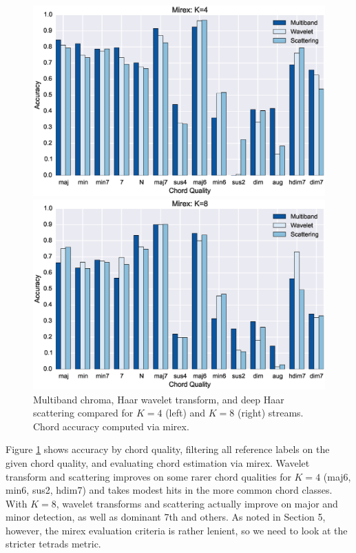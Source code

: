 \documentclass{article}
\begin{document}
\begin{figure}
\centering
\begin{minipage}{\columnwidth}
	\centering
	\includegraphics[width=1.05\columnwidth]{figs/mirex4.eps}
\end{minipage}
\begin{minipage}{\columnwidth}
	\centering
	\includegraphics[width=1.05\columnwidth]{figs/mirex8.eps}
\end{minipage}
\caption{Multiband chroma, Haar wavelet transform, and deep Haar scattering compared for $K=4$ (left) and $K=8$ (right) streams. Chord accuracy computed via mirex.}
\label{fig:mirex}
\end{figure}

Figure \ref{fig:mirex} shows accuracy by chord quality, filtering all reference labels on the given chord quality, and evaluating chord estimation via mirex. Wavelet transform and scattering improves on some rarer chord qualities for $K=4$ (maj6, min6, sus2, hdim7) and takes modest hits in the more common chord classes. With $K=8$, wavelet transforms and scattering actually improve on major and minor detection, as well as dominant 7th and others. As noted in Section 5, however, the mirex evaluation criteria is rather lenient, so we need to look at the stricter tetrads metric.
\end{document}

